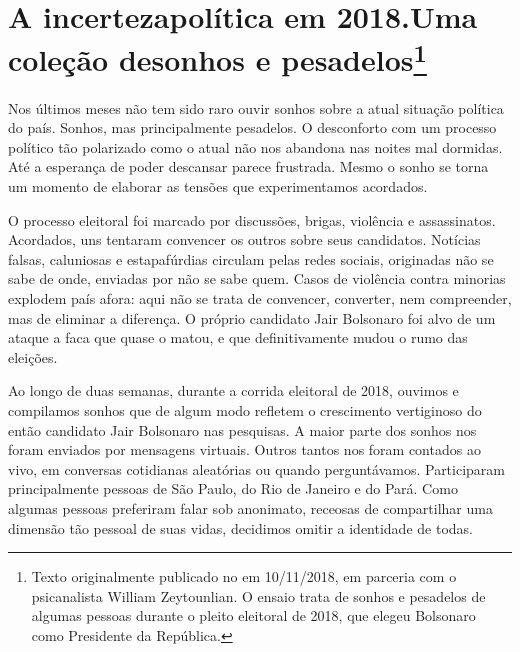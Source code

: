 \chapter*{A incerteza\vspace{-.15cm}\break política em 2018.\vspace{-.15cm}\break Uma coleção de\vspace{-.15cm}\break sonhos e pesadelos\footnote{Texto originalmente publicado no {} em 10/11/2018, em parceria com o psicanalista William Zeytounlian. O ensaio trata de sonhos e pesadelos de algumas pessoas durante o pleito eleitoral de 2018, que elegeu Bolsonaro como Presidente da República.}}

\label{sonhos}

\noindent{}Nos últimos meses não tem sido raro ouvir sonhos sobre a atual situação
política do país. Sonhos, mas principalmente pesadelos. O desconforto com
um processo político tão polarizado como o atual não nos abandona nas
noites mal dormidas. Até a esperança de poder descansar parece
frustrada. Mesmo o sonho se torna um momento de elaborar as tensões que
experimentamos acordados.

O processo eleitoral foi marcado por discussões, brigas, violência e
assassinatos. Acordados, uns tentaram convencer os outros sobre seus
candidatos. Notícias falsas, caluniosas e estapafúrdias circulam pelas
redes sociais, originadas não se sabe de onde, enviadas por não se sabe
quem. Casos de violência contra minorias explodem país afora: aqui não
se trata de convencer, converter, nem compreender, mas de eliminar a
diferença. O próprio candidato Jair Bolsonaro foi alvo de um ataque a
faca que quase o matou, e que definitivamente mudou o rumo das eleições.

Ao longo de duas semanas, durante a corrida eleitoral de 2018, ouvimos e
compilamos sonhos que de algum modo refletem o crescimento vertiginoso
do então candidato Jair Bolsonaro nas pesquisas. A maior parte dos
sonhos nos foram enviados por mensagens virtuais. Outros tantos nos
foram contados ao vivo, em conversas cotidianas aleatórias ou quando
perguntávamos. Participaram principalmente pessoas de São Paulo, do Rio
de Janeiro e do Pará. Como algumas pessoas preferiram falar sob
anonimato, receosas de compartilhar uma dimensão tão pessoal de suas
vidas, decidimos omitir a identidade de todas.

